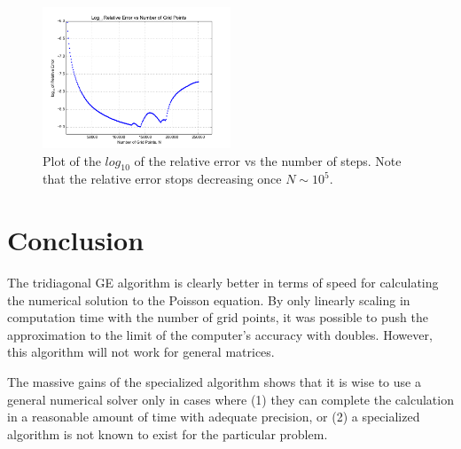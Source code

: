 \documentclass[a4paper,12pt]{report}
\begin{document}
\begin{figure}
\centering
 \includegraphics[width=0.5\textwidth]{ErrorVsNPlotLimit.png}
 \caption{Plot of the $log_{10}$ of the relative error vs the number of steps. Note that the relative error stops decreasing once $N\sim10^5$.}
 \label{fig:EvNL}
\end{figure}



\pagebreak[2]
\section{Conclusion}
The tridiagonal GE algorithm is clearly better in terms of speed for calculating the numerical solution to the Poisson equation. By only linearly scaling in computation time with the number of grid points, it was possible to push the approximation to the limit of the computer's accuracy with doubles. However, this algorithm will not work for general matrices. 

The massive gains of the specialized algorithm shows that it is wise to use a general numerical solver only in cases where (1) they can complete the calculation in a reasonable amount of time with adequate precision, or (2) a specialized algorithm is not known to exist for the particular problem. 


\nocite{*}


\end{document}
